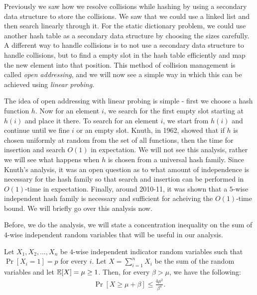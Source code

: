Previously we saw how we resolve collisions while hashing by using a secondary
data structure to store the collisions. We saw that we could use a linked list
and then search linearly through it. For the static dictionary problem, we could
use another hash table as a secondary data structure by choosing the sizes
carefully. A different way to handle collisions is to not use a secondary data
structure to handle collisions, but to find a empty slot in the hash table
efficiently and map the new element into that position. This method of collision
management is called \emph{open addressing}, and we will now see a simple way in
which this can be achieved using \emph{linear probing}.

The idea of open addressing with linear probing is simple - first we choose a
hash function $h$. Now for an element $i$, we search for the first empty slot
starting at $h(i)$ and place it there. To search for an element $i$, we start
from $h(i)$ and continue until we fine $i$ or an empty slot. Knuth, in 1962,
showed that if $h$ is chosen uniformly at random from the set of all functions,
then the time for insertion and search $O(1)$ in expectation. We will not see this analysis, rather we will see what happens when $h$
is chosen from a universal hash family. Since Knuth's analysis, it was an open
question as to what amount of independence is necessary for the hash family so
that search and insertion can be performed in $O(1)$-time in
expectation. Finally, around 2010-11, it was shown that a $5$-wise independent
hash family is necessary and sufficient for acheiving the $O(1)$-time bound. We
will briefly go over this analysis now.

Before, we do the analysis, we will state a concentration inequality on the sum
of $4$-wise independent random variables that will be useful in our analysis.
\begin{lemma}
  Let $X_1, X_2, \ldots, X_n$ be $4$-wise independent indicator random variables
  such that $\Pr[X_i = 1] = p$ for every $i$. Let $X = \sum_{i=1}^n X_i$ be the
  sum of the random variables and let $\mathbb{E}[X] = \mu \geq 1$. Then, for every
  $\beta > \mu$, we have the following:
  \begin{align*}
    \Pr[ X \geq \mu + \beta ] \leq \frac{4\mu^2}{\beta^4}.
  \end{align*}
  \label{lem:conc-4-wise}
\end{lemma}

